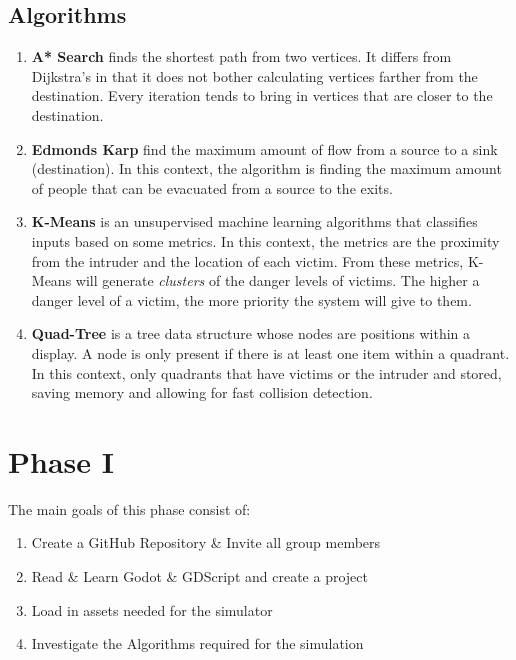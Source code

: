 \documentclass[12pt]{article}
\begin{document}
\subsection*{Algorithms}
\begin{enumerate}
\item \textbf{A* Search} finds the shortest path from two vertices. It differs from Dijkstra's in that it does not bother calculating vertices farther from the destination. Every iteration tends to bring in vertices that are closer to the destination. \\[5pt]
\item \textbf{Edmonds Karp} find the maximum amount of flow from a source to a sink (destination). In this context, the algorithm is finding the maximum amount of people that can be evacuated from a source to the exits.\\[5pt]
\item \textbf{K-Means} is an unsupervised machine learning algorithms that classifies inputs based on some metrics. In this context, the metrics are the proximity from the intruder and the location of each victim. From these metrics, K-Means will generate \textit{clusters} of the danger levels of victims. The higher a danger level of a victim, the more priority the system will give to them.\\[5pt]
\item \textbf{Quad-Tree} is a tree data structure whose nodes are positions within a display. A node is only present if there is at least one item within a quadrant. In this context, only quadrants that have victims or the intruder and stored, saving memory and allowing for fast collision detection.
\end{enumerate}

\section*{Phase I}
The main goals of this phase consist of:
\begin{enumerate}
\item Create a GitHub Repository \& Invite all group members
\item Read \& Learn Godot \& GDScript and create a project
\item Load in assets needed for the simulator
\item Investigate the Algorithms required for the simulation
\end{enumerate}
\end{document}
